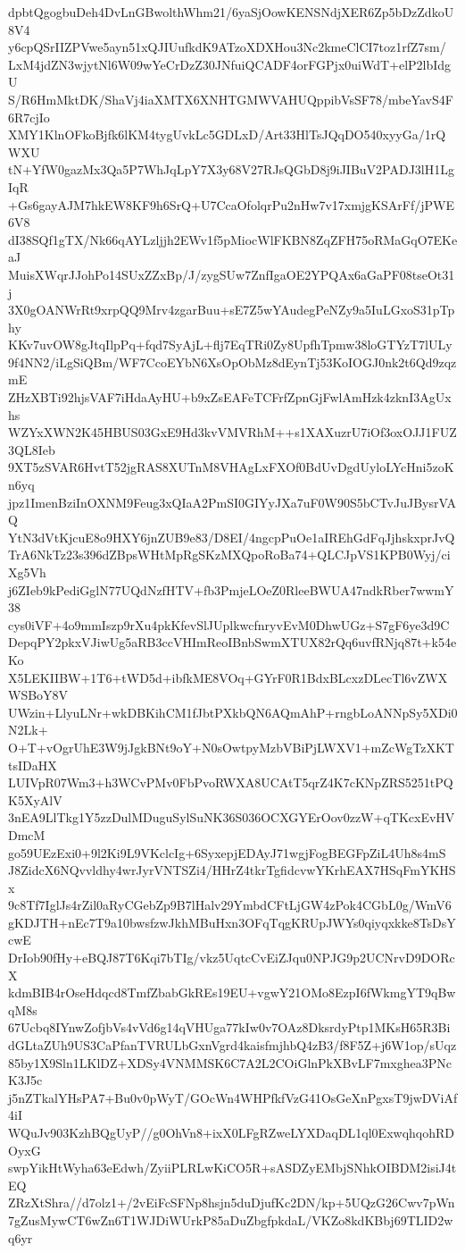 dpbtQgogbuDeh4DvLnGBwolthWhm21/6yaSjOowKENSNdjXER6Zp5bDzZdkoU8V4
y6cpQSrIIZPVwe5ayn51xQJIUufkdK9ATzoXDXHou3Nc2kmeClCI7toz1rfZ7sm/
LxM4jdZN3wjytNl6W09wYeCrDzZ30JNfuiQCADF4orFGPjx0uiWdT+elP2lbIdgU
S/R6HmMktDK/ShaVj4iaXMTX6XNHTGMWVAHUQppibVsSF78/mbeYavS4F6R7cjIo
XMY1KlnOFkoBjfk6lKM4tygUvkLc5GDLxD/Art33HlTsJQqDO540xyyGa/1rQWXU
tN+YfW0gazMx3Qa5P7WhJqLpY7X3y68V27RJsQGbD8j9iJIBuV2PADJ3lH1LgIqR
+Gs6gayAJM7hkEW8KF9h6SrQ+U7CcaOfolqrPu2nHw7v17xmjgKSArFf/jPWE6V8
dI38SQf1gTX/Nk66qAYLzljjh2EWv1f5pMiocWlFKBN8ZqZFH75oRMaGqO7EKeaJ
MuisXWqrJJohPo14SUxZZxBp/J/zygSUw7ZnfIgaOE2YPQAx6aGaPF08tseOt31j
3X0gOANWrRt9xrpQQ9Mrv4zgarBuu+sE7Z5wYAudegPeNZy9a5IuLGxoS31pTphy
KKv7uvOW8gJtqIlpPq+fqd7SyAjL+flj7EqTRi0Zy8UpfhTpmw38loGTYzT7lULy
9f4NN2/iLgSiQBm/WF7CcoEYbN6XsOpObMz8dEynTj53KoIOGJ0nk2t6Qd9zqzmE
ZHzXBTi92hjsVAF7iHdaAyHU+b9xZsEAFeTCFrfZpnGjFwlAmHzk4zknI3AgUxhs
WZYxXWN2K45HBUS03GxE9Hd3kvVMVRhM++s1XAXuzrU7iOf3oxOJJ1FUZ3QL8Ieb
9XT5zSVAR6HvtT52jgRAS8XUTnM8VHAgLxFXOf0BdUvDgdUyloLYcHni5zoKn6yq
jpz1ImenBziInOXNM9Feug3xQIaA2PmSI0GIYyJXa7uF0W90S5bCTvJuJBysrVAQ
YtN3dVtKjcuE8o9HXY6jnZUB9e83/D8EI/4ngcpPuOe1aIREhGdFqJjhskxprJvQ
TrA6NkTz23s396dZBpsWHtMpRgSKzMXQpoRoBa74+QLCJpVS1KPB0Wyj/ciXg5Vh
j6ZIeb9kPediGglN77UQdNzfHTV+fb3PmjeLOeZ0RleeBWUA47ndkRber7wwmY38
cys0iVF+4o9mmIszp9rXu4pkKfevSlJUplkwcfnryvEvM0DhwUGz+S7gF6ye3d9C
DepqPY2pkxVJiwUg5aRB3ccVHImReoIBnbSwmXTUX82rQq6uvfRNjq87t+k54eKo
X5LEKIIBW+1T6+tWD5d+ibfkME8VOq+GYrF0R1BdxBLcxzDLecTl6vZWXWSBoY8V
UWzin+LlyuLNr+wkDBKihCM1fJbtPXkbQN6AQmAhP+rngbLoANNpSy5XDi0N2Lk+
O+T+vOgrUhE3W9jJgkBNt9oY+N0sOwtpyMzbVBiPjLWXV1+mZcWgTzXKTtsIDaHX
LUIVpR07Wm3+h3WCvPMv0FbPvoRWXA8UCAtT5qrZ4K7cKNpZRS5251tPQK5XyAlV
3nEA9LlTkg1Y5zzDulMDuguSylSuNK36S036OCXGYErOov0zzW+qTKcxEvHVDmcM
go59UEzExi0+9l2Ki9L9VKclcIg+6SyxepjEDAyJ71wgjFogBEGFpZiL4Uh8s4mS
J8ZidcX6NQvvldhy4wrJyrVNTSZi4/HHrZ4tkrTgfidcvwYKrhEAX7HSqFmYKHSx
9c8Tf7IglJs4rZil0aRyCGebZp9B7lHalv29YmbdCFtLjGW4zPok4CGbL0g/WmV6
gKDJTH+nEc7T9a10bwsfzwJkhMBuHxn3OFqTqgKRUpJWYs0qiyqxkke8TsDsYcwE
DrIob90fHy+eBQJ87T6Kqi7bTIg/vkz5UqtcCvEiZJqu0NPJG9p2UCNrvD9DORcX
kdmBIB4rOseHdqcd8TmfZbabGkREs19EU+vgwY21OMo8EzpI6fWkmgYT9qBwqM8s
67Ucbq8IYnwZofjbVs4vVd6g14qVHUga77kIw0v7OAz8DksrdyPtp1MKsH65R3Bi
dGLtaZUh9US3CaPfanTVRULbGxnVgrd4kaisfmjhbQ4zB3/f8F5Z+j6W1op/sUqz
85by1X9Sln1LKlDZ+XDSy4VNMMSK6C7A2L2COiGlnPkXBvLF7mxghea3PNcK3J5c
j5nZTkalYHsPA7+Bu0v0pWyT/GOcWn4WHPfkfVzG41OsGeXnPgxsT9jwDViAf4iI
WQuJv903KzhBQgUyP//g0OhVn8+ixX0LFgRZweLYXDaqDL1ql0ExwqhqohRDOyxG
swpYikHtWyha63eEdwh/ZyiiPLRLwKiCO5R+sASDZyEMbjSNhkOIBDM2isiJ4tEQ
ZRzXtShra//d7olz1+/2vEiFcSFNp8hsjn5duDjufKc2DN/kp+5UQzG26Cwv7pWn
7gZusMywCT6wZn6T1WJDiWUrkP85aDuZbgfpkdaL/VKZo8kdKBbj69TLID2wq6yr
